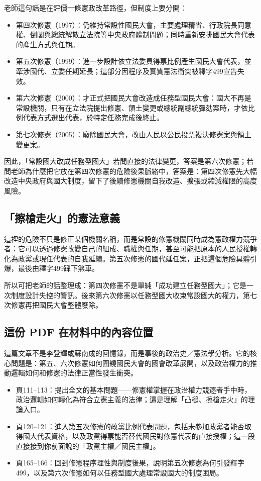 老師這句話是在評價一條憲政改革路徑，但制度上要分開：

\begin{itemize}
\tightlist
\item
  第四次修憲（1997）：仍維持常設性國民大會，主要處理精省、行政院長同意權、倒閣與總統解散立法院等中央政府體制問題；同時重新安排國民大會代表的產生方式與任期。
\item
  第五次修憲（1999）：進一步設計依立法委員得票比例產生國民大會代表，並牽涉國代、立委任期延長；這部分因程序及實質憲法衝突被釋字499宣告失效。
\item
  第六次修憲（2000）：才正式把國民大會改造成任務型國民大會：國大不再是常設機關，只有在立法院提出修憲、領土變更或總統副總統彈劾案時，才依比例代表方式選出代表，於特定任務完成後終止。
\item
  第七次修憲（2005）：廢除國民大會，改由人民以公民投票複決修憲案與領土變更案。
\end{itemize}

因此，「常設國大改成任務型國大」若問直接的法律變更，答案是第六次修憲；若問老師為什麼把它放在第四次修憲的危險後果脈絡中，答案是：第四次修憲先大幅改造中央政府與國大制度，留下了後續修憲機關自我改造、擴張或縮減權限的高度風險。

\subsection{「擦槍走火」的憲法意義}

這裡的危險不只是修正某個機關名稱，而是常設的修憲機關同時成為憲政權力競爭者：它可以透過修憲改變自己的組成、職權與任期，甚至可能把原本的人民授權轉化為政黨或現任代表的自我延續。第五次修憲的國代延任案，正把這個危險具體引爆，最後由釋字499踩下煞車。

所以可把老師的話整理成：第四次修憲不是單純「成功建立任務型國大」；它是一次制度設計失控的警訊。後來第六次修憲以任務型國大收束常設國大的權力，第七次修憲再把國民大會整體廢除。

\subsection{這份 PDF 在材料中的內容位置}

這篇文章不是李登輝或蘇南成的回憶錄，而是事後的政治史／憲法學分析。它的核心問題是：第五、六次修憲如何圍繞國民大會的國會改革展開，以及政治權力的推動邏輯如何和修憲的法律正當性發生衝突。

\begin{itemize}
\tightlist
\item
  頁111--113：提出全文的基本問題------修憲權掌握在政治權力競逐者手中時，政治邏輯如何轉化為符合立憲主義的法律；這是理解「凸槌、擦槍走火」的理論入口。
\item
  頁120--121：進入第五次修憲的政黨比例代表問題，包括未參加政黨者能否取得國大代表資格，以及政黨得票能否替代國民對修憲代表的直接授權；這一段直接接到你前面說的「政黨主權／國民主權」。
\item
  頁165--166：回到修憲程序理性與制度後果，說明第五次修憲為何引發釋字499，以及第六次修憲如何以任務型國大處理常設國大的制度困局。
\end{itemize}

